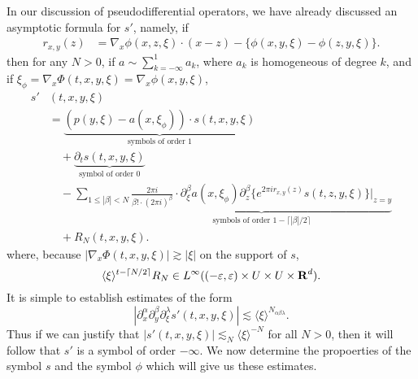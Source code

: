 In our discussion of pseudodifferential operators, we have already discussed an asymptotic formula for $s'$, namely, if
%
\begin{align*}
    r_{x,y}(z) &= \nabla_x \phi(x,z,\xi) \cdot (x - z) - \{ \phi(x,y,\xi) - \phi(z,y,\xi) \}.
\end{align*}
%
then for any $N > 0$, if $a \sim \sum_{k = -\infty}^1 a_k$, where $a_k$ is homogeneous of degree $k$, and if $\xi_\phi = \nabla_x \Phi(t,x,y,\xi) = \nabla_x \phi(x,y,\xi)$,
\begin{align*}
    s' & (t,x,y,\xi)\\
    &= \underbrace{ \left( p(y,\xi) - a(x, \xi_\phi) \right) \cdot s(t,x,y,\xi) }_{\text{symbols of order 1}}\\
    &\quad + \underbrace{\partial_t s(t,x,y,\xi)}_{\text{symbol of order $0$}}  \\
    &\quad - \sum_{1 \leq |\beta| < N} \underbrace{\frac{2 \pi i}{\beta! \cdot (2 \pi i)^\beta} \cdot \partial_\xi^\beta a(x, \xi_\phi) \partial_z^\beta \{ e^{2 \pi i r_{x,y}(z)} s(t,z,y,\xi) \} |_{z = y}}_{\text{symbols of order $1 - \lceil |\beta| / 2 \rceil$}}\\
    &\quad + R_N(t,x,y,\xi).
\end{align*}
%
where, because $|\nabla_x \Phi(t,x,y,\xi)| \gtrsim |\xi|$ on the support of $s$,
%
\[ \langle \xi \rangle^{t - \lceil N/2 \rceil} R_N \in L^\infty((-\varepsilon,\varepsilon) \times U \times U \times \operatorname{\mathbf{R}}^d). \]
%
It is simple to  establish estimates of the form
%
\[ |\partial_x^\alpha \partial_y^\beta \partial_\xi^\lambda s'(t,x,y,\xi)| \lesssim \langle \xi \rangle^{N_{\alpha \beta \lambda}}. \]
%
Thus if we can justify that $|s'(t,x,y,\xi)| \lesssim_N \langle \xi \rangle^{-N}$ for all $N > 0$, then it will follow that $s'$ is a symbol of order $-\infty$. We now determine the propoerties of the symbol $s$ and the symbol $\phi$ which will give us these estimates.

